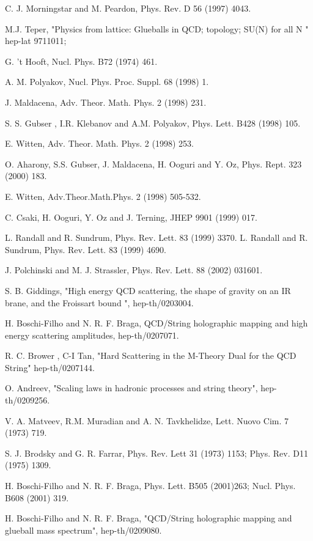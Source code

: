 \documentclass[a4paper,twocolumn,prl,groupedaddress,nofootinbib,showpacs]{revtex4}
\begin{document}
\begin{thebibliography}{30}

C. J. Morningstar and M. Peardon, Phys. Rev. D 56 (1997) 4043.

 M.J. Teper, "Physics from lattice: Glueballs in QCD; 
topology; SU(N) for all N " hep-lat 9711011;

 G. 't Hooft, Nucl. Phys. B72 (1974) 461.

 A. M. Polyakov, Nucl. Phys. Proc. Suppl. 68 (1998) 1.

 J. Maldacena, Adv. Theor. Math. Phys. 2 (1998) 231.

 S. S. Gubser , I.R. Klebanov and A.M. Polyakov, 
Phys. Lett. B428 (1998) 105.

 E. Witten, Adv. Theor. Math. Phys. 2 (1998) 253.

 O. Aharony, S.S. Gubser, J. Maldacena, 
H. Ooguri and Y. Oz, Phys. Rept. 323 (2000) 183.

 E. Witten, Adv.Theor.Math.Phys. 2 (1998) 505-532.

C. Csaki, H. Ooguri, Y. Oz and J. Terning, JHEP 9901 (1999) 017.

 L. Randall and R. Sundrum, Phys. Rev. Lett. 83 (1999) 
3370.
 L. Randall and R. Sundrum, Phys. Rev. Lett. 83 (1999)
4690.

J. Polchinski and M. J. Strassler, Phys. Rev. Lett. 88 (2002) 031601.

S. B. Giddings, "High energy QCD scattering, the shape of gravity 
on an IR brane, and the Froissart bound ",  hep-th/0203004.

 H. Boschi-Filho and N. R. F. Braga,
QCD/String holographic mapping and high energy scattering amplitudes, 
hep-th/0207071. 

R. C. Brower , C-I Tan, "Hard Scattering in the M-Theory Dual for the 
QCD String" hep-th/0207144.

O. Andreev, "Scaling laws in hadronic processes and string theory",
hep-th/0209256.

 V. A. Matveev, R.M. Muradian and A. N. Tavkhelidze,
 Lett. Nuovo Cim. 7 (1973) 719.

S. J. Brodsky and G. R. Farrar, Phys. Rev. Lett 31 (1973) 1153;
Phys. Rev. D11 (1975) 1309.

H. Boschi-Filho and N. R. F. Braga, Phys. Lett. B505 (2001)263; 
Nucl. Phys. B608 (2001) 319.

H. Boschi-Filho and N. R. F. Braga, "QCD/String holographic
 mapping and glueball mass spectrum",   hep-th/0209080.


 \end{thebibliography}
\end{document}
